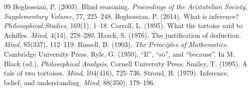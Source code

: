 \documentclass{situationist-preprint}
\begin{document}
\begin{thebibliography}{99}\small
{} Boghossian, P. (2003). Blind reasoning. \emph{Proceedings of the Aristotelian Society, Supplementary Volume}, 77, 225--248.
 Boghossian, P. (2014). What is inference? \emph{Philosophical Studies}, 169(1), 1--18.
 Carroll, L. (1895). What the tortoise said to Achilles. \emph{Mind}, 4(14), 278--280.
 Haack, S. (1976). The justification of deduction. \emph{Mind}, 85(337), 112--119.
 Russell, B. (1903). \emph{The Principles of Mathematics}. Cambridge University Press.
 Ryle, G. (1950). \enquote{If}, \enquote{so}, and \enquote{because}. In M. Black (ed.), \emph{Philosophical Analysis}, Cornell University Press.
 Smiley, T. (1995). A tale of two tortoises. \emph{Mind}, 104(416), 725--736.
 Stroud, B. (1979). Inference, belief, and understanding. \emph{Mind}, 88(350), 179--196.
\end{thebibliography}
\end{document}
